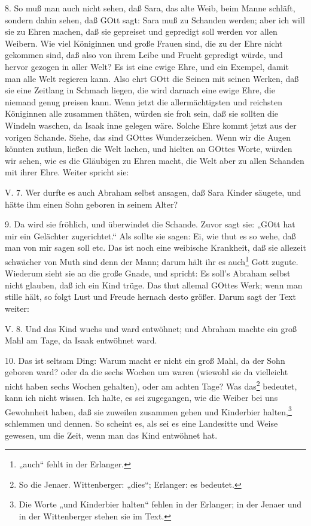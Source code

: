 8. So muß man auch nicht sehen, daß Sara, das alte Weib, beim Manne schläft, sondern dahin sehen, daß GOtt sagt: Sara muß zu Schanden werden; aber ich will sie zu Ehren machen, daß sie gepreiset und gepredigt soll werden vor allen Weibern. Wie viel Königinnen und große Frauen sind, die zu der Ehre nicht gekommen sind, daß also von ihrem Leibe und Frucht gepredigt würde, und hervor gezogen in aller Welt? Es ist eine ewige Ehre, und ein Exempel, damit man alle Welt regieren kann. Also ehrt GOtt die Seinen mit seinen Werken, daß sie eine Zeitlang in Schmach liegen, die wird darnach eine ewige Ehre, die niemand genug preisen kann. Wenn jetzt die allermächtigsten und reichsten Königinnen alle zusammen thäten, würden sie froh sein, daß sie sollten die Windeln waschen, da Isaak inne gelegen wäre.
Solche Ehre kommt jetzt aus der vorigen Schande. Siehe, das sind GOttes Wunderzeichen. Wenn wir die Augen könnten zuthun, ließen die Welt lachen, und hielten an GOttes Worte, würden wir sehen, wie es die Gläubigen zu Ehren macht, die Welt aber zu allen Schanden mit ihrer Ehre. Weiter spricht sie:

\begin{schriftzitat}
V. 7. Wer durfte es auch Abraham selbst ansagen, daß Sara Kinder säugete, und hätte ihm einen Sohn geboren in seinem Alter?
\end{schriftzitat}

9. Da wird sie fröhlich, und überwindet die Schande. Zuvor sagt sie: „GOtt hat mir ein Gelächter zugerichtet.“ Als sollte sie sagen: Ei, wie thut es so wehe, daß man von mir sagen soll etc. Das ist noch eine weibische Krankheit, daß sie allezeit schwächer von Muth sind denn der Mann; darum hält ihr es auch\footnote{„auch“ fehlt in der Erlanger.} Gott zugute. Wiederum sieht sie an die große Gnade, und spricht: Es soll's Abraham selbst nicht glauben, daß ich ein Kind trüge. Das thut allemal GOttes Werk; wenn man stille hält, so folgt Lust und Freude hernach desto größer. Darum sagt der Text weiter:

\begin{schriftzitat}
V. 8. Und das Kind wuchs und ward entwöhnet; und Abraham machte ein groß Mahl am Tage, da Isaak entwöhnet ward.
\end{schriftzitat}

10. Das ist seltsam Ding: Warum macht er nicht ein groß Mahl, da der Sohn geboren ward? oder da die sechs Wochen um waren (wiewohl sie da vielleicht nicht haben sechs Wochen gehalten), oder am achten Tage? Was das\footnote{So die Jenaer. Wittenberger: „dies“; Erlanger: es bedeutet.} bedeutet, kann ich nicht wissen. Ich halte, es sei zugegangen, wie die Weiber bei uns Gewohnheit haben, daß sie zuweilen zusammen gehen und Kinderbier halten,\footnote{Die Worte „und Kinderbier halten“ fehlen in der Erlanger; in der Jenaer und in der Wittenberger stehen sie im Text.} schlemmen und dennen. So scheint es, als sei es eine Landesitte und Weise gewesen, um die Zeit, wenn man das Kind entwöhnet hat.

